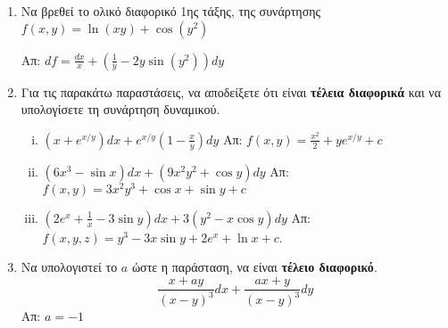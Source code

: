 \documentclass[a4paper,table]{report}
\begin{document}
\begin{enumerate}

  \item Να βρεθεί το ολικό διαφορικό 1ης τάξης, της συνάρτησης 
    $f(x,y)=\ln(xy)+\cos(y^2)$ 

    \hfill Απ: $df=\frac{dx}{x}+\left(\frac{1}{y}-2y\sin(y^2)\right)dy$

  \item Για τις παρακάτω παραστάσεις, να αποδείξετε ότι είναι \textbf{τέλεια
    διαφορικά} και να υπολογίσετε τη συνάρτηση δυναμικού.
    \begin{enumerate}[i)]
      \item $ \left(x+e^{x/y}\right)dx + e^{x/y}\left(1- \frac{x}{y}\right)dy $
        \hfill Απ: $ f(x,y) = \frac{x^{2}}{2} +y e^{x/y} + c $ 

      \item $ (6x^{3}- \sin{x})dx + (9x^{2}y^{2}+ \cos{y})dy $ 
        \hfill Απ: $ f(x,y) = 3x^{2}y^{3}+ \cos{x} + \sin{y} + c $  

      \item $\left(2e^{x}+\frac{1}{x}-3\sin y\right)dx+3(y^2-x\cos y)dy$ 
        \hfill  Απ: $ f(x,y,z) = y^{3}-3x \sin{y} + 2e^{x} + \ln{x} +c $.
    \end{enumerate}

  \item Να υπολογιστεί το $a$ ώστε η παράσταση, να είναι \textbf{τέλειο διαφορικό}.
    \[ \frac{ x + ay }{ (x-y)^{3} }dx + \frac{ ax+y }{ (x-y)^{3} }dy \]
    \hfill Απ: $ a=-1 $
\end{enumerate}
\end{document}
